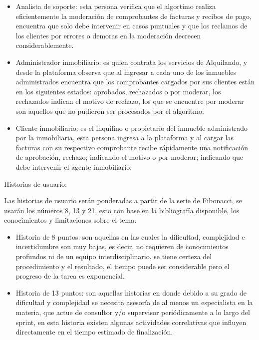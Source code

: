 \documentclass[
11pt, %
]{charter}
\begin{document}
\begin{•}
\begin{itemize}
	\item Analista de soporte: esta persona verifica que el algortimo realiza eficientemente la moderación de comprobantes de facturas y recibos de pago, encuentra que solo debe intervenir en casos puntuales y que los reclamos de los clientes por errores o demoras en la moderación decrecen considerablemente.
	
	\item Administrador inmobiliario: es quien contrata los servicios de Alquilando, y desde la plataforma observa que al ingresar a cada uno de los inmuebles administrados encuentra que los comprobantes cargados por sus clientes están en los siguientes estados: aprobados, rechazados o por moderar, los rechazados indican el motivo de rechazo, los que se encuentre por moderar son aquellos que no pudieron ser procesados por el algoritmo.
	
	\item Cliente inmobiliario: es el inquilino o propietario del inmueble administrado por la inmobiliaria, esta persona ingresa a la plataforma y al cargar las facturas con su respectivo comprobante recibe rápidamente una notificación de aprobación, rechazo; indicando el motivo o por moderar; indicando que debe intervenir el agente inmobiliario.
	
\end{itemize}

Historias de usuario:

Las historias de usuario serán ponderadas a partir de la serie de Fibonacci, se usarán los números 8, 13 y 21, esto con base en la bibliografía disponible, los conocimientos y limitaciones sobre el tema.

\begin{itemize}

	\item Historia de 8 puntos: son aquellas en las cuales la dificultad, complejidad e incertidumbre son muy bajas, es decir, no requieren de conocimientos profundos ni de un equipo interdisciplinario, se tiene certeza del procedimiento y el resultado, el tiempo puede ser considerable pero el progreso de la tarea es exponencial.
	
	\item Historia de 13 puntos: son aquellas historias en donde debido a su grado de dificultad y complejidad se necesita asesoría de al menos un especialista en la materia,  que actue de consultor y/o supervisor periódicamente a lo largo del sprint, en esta historia existen algunas actividades correlativas que influyen directamente en el tiempo estimado de finalización.
	

\end{itemize}
\end{•}
\end{document}
